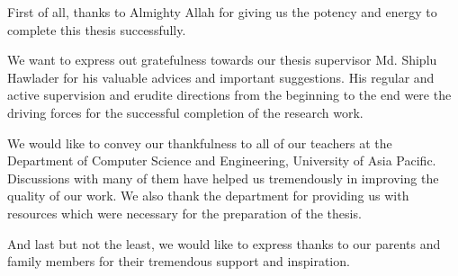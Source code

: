 First of all, thanks to Almighty Allah for giving us the potency and energy to complete
this thesis successfully.

We want to express out gratefulness towards our thesis supervisor Md. Shiplu Hawlader
for his valuable advices and important suggestions. His regular and active supervision
and erudite directions from the beginning to the end were the driving forces for the
successful completion of the research work.

We would like to convey our thankfulness to all of our teachers at the Department of
Computer Science and Engineering, University of Asia Pacific. Discussions with many
of them have helped us tremendously in improving the quality of our work. We also
thank the department for providing us with resources which were necessary for the
preparation of the thesis.

And last but not the least, we would like to express thanks to our parents and family
members for their tremendous support and inspiration.
